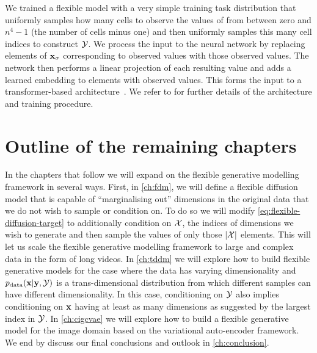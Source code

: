 We trained a flexible model with a very simple training task distribution that uniformly samples how many cells to observe the values of from between zero and $n^4-1$ (the number of cells minus one) and then uniformly samples this many cell indices to construct ${\mathcal{Y}}$. We process the input to the neural network by replacing elements of ${\mathbf{x}}_\sigma$ corresponding to observed values with those observed values. The network then performs a linear projection of each resulting value and adds a learned embedding to elements with observed values. This forms the input to a transformer-based architecture~\citep{vaswani2017attention}. We refer to \citet{weilbach2023graphically} for further details of the architecture and training procedure.

\section{Outline of the remaining chapters}
In the chapters that follow we will expand on the flexible generative modelling framework in several ways. First, in \cref{ch:fdm}, we will define a flexible diffusion model that is capable of ``marginalising out'' dimensions in the original data that we do not wish to sample or condition on. To do so we will modify \cref{eq:flexible-diffusion-target} to additionally condition on ${\mathcal{X}}$, the indices of dimensions we wish to generate and then sample the values of only those $|{\mathcal{X}}|$ elements. This will let us scale the flexible generative modelling framework to large and complex data in the form of long videos. In \cref{ch:tddm} we will explore how to build flexible generative models for the case where the data has varying dimensionality and $p_{\rm{data}}({\mathbf{x}} | {\mathbf{y}}, {\mathcal{Y}})$ is a trans-dimensional distribution from which different samples can have different dimensionality. In this case, conditioning on ${\mathcal{Y}}$ also implies conditioning on ${\mathbf{x}}$ having at least as many dimensions as suggested by the largest index in ${\mathcal{Y}}$. In \cref{ch:cigcvae} we will explore how to build a flexible generative model for the image domain based on the variational auto-encoder framework. We end by discuss our final conclusions and outlook in \cref{ch:conclusion}.
